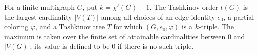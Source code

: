 \begin{definition}
For a finite multigraph $G$, put $k=\chi'(G)-1$.  The Tashkinov order
$t(G)$ is the largest cardinality $|V(T)|$ among all choices of an edge
identity $e_0$, a partial coloring $\varphi$, and a Tashkinov tree $T$ for
which $(G,e_0,\varphi)$ is a $k$-triple.  The maximum is taken over the
finite set of attainable cardinalities between $0$ and $|V(G)|$; its value
is defined to be $0$ if there is no such triple.
\end{definition}
